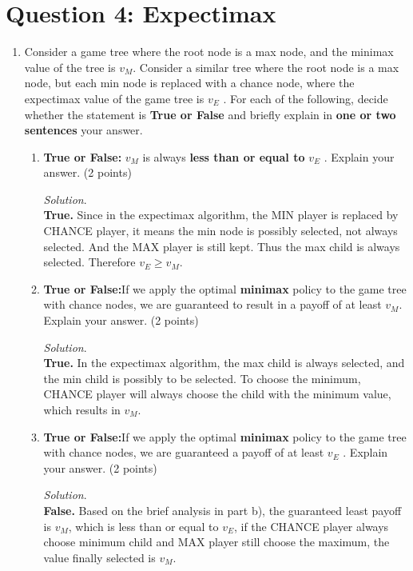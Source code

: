 \documentclass[10pt]{article}
\begin{document}
\section*{Question 4: Expectimax}
\begin{enumerate}
    \item Consider a game tree where the root node is a max node, and the minimax value of the tree is $v_M$. Consider a similar tree where the root node is a max node, but each min node is replaced with a chance node, where the expectimax value of the game tree is $v_E$ . For each of the following, decide whether the statement is \textbf{True or False} and briefly explain in \textbf{one or two sentences} your answer.
    \begin{enumerate}
        \item \textbf{True or False:} $v_M$ is always \textbf{less than or equal to} $v_E$ . Explain your answer. (2 points)
        \begin{mdframed}[leftmargin=-6.5mm]
        \textit{Solution}.\\
        \textbf{True. }Since in the expectimax algorithm, the MIN player is replaced by CHANCE player, it means the min node is possibly selected, not always selected. And the MAX player is still kept. Thus the max child is always selected. Therefore $v_E \geq v_M$.
        \end{mdframed}
        \item \textbf{True or False:}If we apply the optimal \textbf{minimax} policy to the game tree with chance nodes, we are guaranteed to result in a payoff of at least $v_M$. Explain your answer. (2 points)
        \begin{mdframed}[leftmargin=-6.5mm]
        \textit{Solution}.\\
        \textbf{True. }In the expectimax algorithm, the max child is always selected, and the min child is possibly to be selected. To choose the minimum, CHANCE player will always choose the child with the minimum value, which results in $v_M$.
        \end{mdframed}
        \item \textbf{True or False:}If we apply the optimal \textbf{minimax} policy to the game tree with chance nodes, we are guaranteed a payoff of at least $v_E$ . Explain your answer. (2 points)
        \begin{mdframed}[leftmargin=-6.5mm]
        \textit{Solution}.\\
        \textbf{False. }Based on the brief analysis in part b), the guaranteed least payoff is $v_M$, which is less than or equal to $v_E$, if the CHANCE player always choose minimum child and MAX player still choose the maximum, the value finally selected is $v_M$.
        \end{mdframed}
    \end{enumerate}
\end{enumerate}
\end{document}
